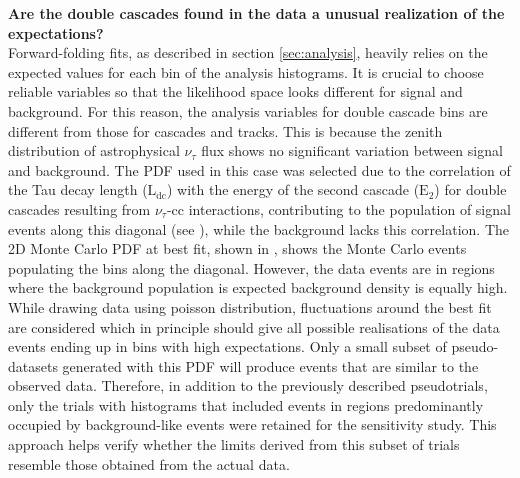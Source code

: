 \textbf{Are the double cascades found in the data a unusual realization of the expectations?}\\

Forward-folding fits, as described in section \ref{sec:analysis}, heavily relies on the expected values for each bin of the analysis histograms. It is crucial to choose reliable variables so that the likelihood space looks different for signal and background. For this reason, the analysis variables for double cascade bins are different from those for cascades and tracks. This is because the zenith distribution of astrophysical $\nu_{\tau}$ flux shows no significant variation between signal and background. The PDF used in this case was selected due to the correlation of the Tau decay length ($\mathrm{L}_{\mathrm{dc}}$) with the energy of the second cascade ($\mathrm{E}_{2}$) for double cascades resulting from $\nu_{\tau}$-cc interactions, contributing to the population of signal events along this diagonal (see ), while the background lacks this correlation. The 2D Monte Carlo PDF at best fit, shown in , shows the  Monte Carlo events populating the bins along the diagonal. However, the data events are in regions where the background population is expected background density is equally high. While drawing data using poisson distribution, fluctuations around the best fit are considered which in principle should give all possible realisations of the data events ending up in bins with high expectations. Only a small subset of pseudo-datasets generated with this PDF will produce events that are similar to the observed data. Therefore, in addition to the previously described pseudotrials, only the trials with histograms that included events in regions predominantly occupied by background-like events were retained for the sensitivity study. This approach helps verify whether the limits derived from this subset of trials resemble those obtained from the actual data.


